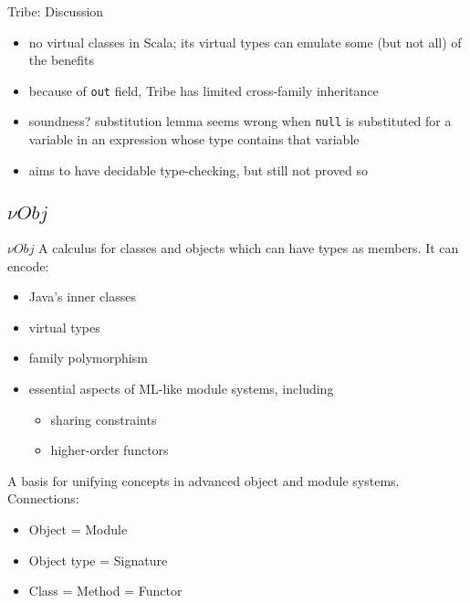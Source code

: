 \documentclass{beamer}
\begin{document}

\begin{frame}{Tribe: Discussion}
\begin{itemize}
\item no virtual classes in Scala; its virtual types can emulate some (but not all) of the benefits
\item because of {\tt out} field, Tribe has limited cross-family inheritance %
\item soundness? substitution lemma seems wrong when {\tt null} is
  substituted for a variable in an expression whose type contains
  that variable %
\item aims to have decidable type-checking, but still not proved so
\end{itemize}
\end{frame}


\subsection{${\nu}Obj$}

\begin{frame}{${\nu}Obj$}
A calculus for classes and objects which can have types as members. It can encode:
\begin{itemize}
\item Java's inner classes
\item virtual types
\item family polymorphism
\item essential aspects of ML-like module systems, including
\begin{itemize}
\item sharing constraints
\item higher-order functors
\end{itemize}
\end{itemize}
A basis for unifying concepts  in advanced object and module systems. Connections:
\begin{itemize}
\item Object = Module
\item Object type = Signature
\item Class = Method = Functor
\end{itemize}
\end{frame}
\end{document}
